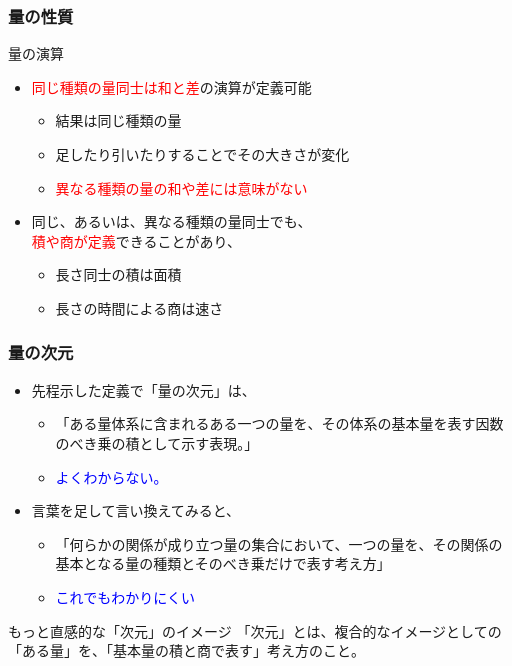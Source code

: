\documentclass[12pt, dvipdfmx]{beamer}
\begin{document}
\begin{frame}
	\frametitle{量の性質}
	\begin{exampleblock}{量の演算}
		\begin{itemize}
			\item \textcolor{red}{同じ種類の量同士は和と差}の演算が定義可能
			\begin{itemize}
				\item 結果は同じ種類の量
				\item 足したり引いたりすることでその大きさが変化
				\item \textcolor{red}{異なる種類の量の和や差には意味がない}
			\end{itemize}
			\item 同じ、あるいは、異なる種類の量同士でも、\\ \textcolor{red}{積や商が定義}できることがあり、
			\begin{itemize}
				\item 長さ同士の積は面積
				\item 長さの時間による商は速さ
			\end{itemize}
		\end{itemize}
	\end{exampleblock}
\end{frame}

\begin{frame}
	\frametitle{量の次元}
	\begin{itemize}
		\item 先程示した定義で「量の次元」は、
		\begin{itemize}
			\item 「ある量体系に含まれるある一つの量を、その体系の基本量を表す因数のべき乗の積として示す表現。」
			\item \textcolor{blue}{よくわからない。}
		\end{itemize}
		\item 言葉を足して言い換えてみると、
		\begin{itemize}
			\item 「何らかの関係が成り立つ量の集合において、一つの量を、その関係の基本となる量の種類とそのべき乗だけで表す考え方」
			\item \textcolor{blue}{これでもわかりにくい}
		\end{itemize}
	\end{itemize}
	\begin{exampleblock}{もっと直感的な「次元」のイメージ}
		「次元」とは、複合的なイメージとしての「ある量」を、「基本量の積と商で表す」考え方のこと。
	\end{exampleblock}
\end{frame}
\end{document}

